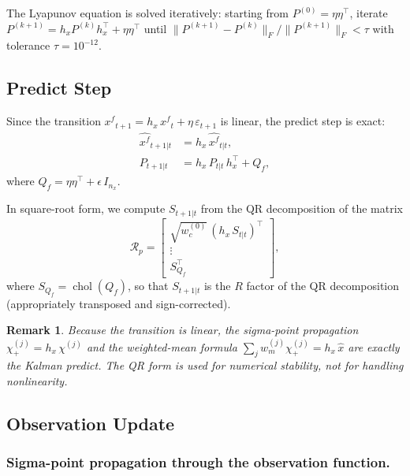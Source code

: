 \documentclass[12pt,a4paper]{article}
\newtheorem{remark}[theorem]{Remark}
\newcommand{\xf}{{x^{f}}}
\newcommand{\hx}{h_x}
\DeclareMathOperator{\chol}{chol}
\begin{document}
The Lyapunov equation is solved iteratively: starting from
$P^{(0)} = \eta\eta^\top$, iterate
$P^{(k+1)} = \hx P^{(k)} \hx^\top + \eta\eta^\top$ until
$\|P^{(k+1)} - P^{(k)}\|_F / \|P^{(k+1)}\|_F < \tau$
with tolerance $\tau = 10^{-12}$.

\subsection{Predict Step}\label{sec:predict}

Since the transition $\xf_{t+1} = \hx\,\xf_t + \eta\,\varepsilon_{t+1}$
is linear, the predict step is exact:
\begin{align}
\hat{\xf}_{t+1|t} &= \hx\,\hat{\xf}_{t|t},
  \label{eq:predict-mean} \\
P_{t+1|t} &= \hx\,P_{t|t}\,\hx^\top + Q_f,
  \label{eq:predict-cov}
\end{align}
where $Q_f = \eta\eta^\top + \epsilon\,I_{n_x}$.

In square-root form, we compute $S_{t+1|t}$ from the QR decomposition
of the matrix
\begin{equation}\label{eq:qr-predict}
\mathcal{R}_p =
\begin{bmatrix}
\sqrt{w_c^{(0)}}\,(\hx\,S_{t|t})^\top \\
\vdots \\
S_{Q_f}^\top
\end{bmatrix},
\end{equation}
where $S_{Q_f} = \chol(Q_f)$, so that $S_{t+1|t}$ is the $R$ factor
of the QR decomposition (appropriately transposed and sign-corrected).

\begin{remark}
Because the transition is linear, the sigma-point propagation
$\chi^{(j)}_+ = \hx\,\chi^{(j)}$ and the weighted-mean formula
$\sum_j w_m^{(j)} \chi^{(j)}_+ = \hx\,\hat{x}$ are exactly the
Kalman predict. The QR form is used for numerical stability, not
for handling nonlinearity.
\end{remark}

\subsection{Observation Update}\label{sec:update}

\subsubsection{Sigma-point propagation through the observation function.}
\end{document}
